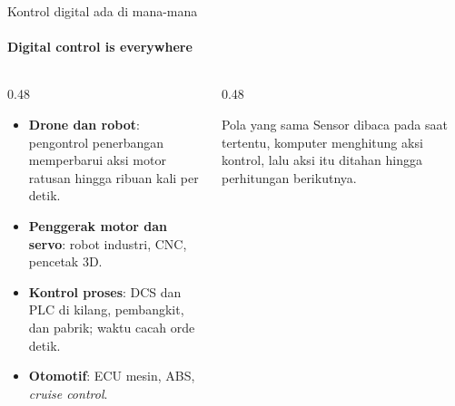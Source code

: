 \documentclass[aspectratio=169,10pt]{beamer}
\begin{document}
\begin{frame}{Kontrol digital ada di mana-mana}
	\framesubtitle{Digital control is everywhere}
	\begin{columns}[T]
		\begin{column}{0.48\textwidth}
			\begin{itemize}
				\item \textbf{Drone dan robot}: pengontrol penerbangan memperbarui aksi motor ratusan hingga ribuan kali per detik.
				\item \textbf{Penggerak motor dan servo}: robot industri, CNC, pencetak 3D.
				\item \textbf{Kontrol proses}: DCS dan PLC di kilang, pembangkit, dan pabrik; waktu cacah orde detik.
				\item \textbf{Otomotif}: ECU mesin, ABS, \textit{cruise control}.
			\end{itemize}
		\end{column}
		\begin{column}{0.48\textwidth}
			\begin{block}{Pola yang sama}
				\small
				Sensor dibaca \alert{pada saat tertentu}, komputer menghitung aksi kontrol, lalu aksi itu \alert{ditahan} hingga perhitungan berikutnya.\\[4pt]
			\end{block}
		\end{column}
	\end{columns}
\end{frame}
\end{document}
